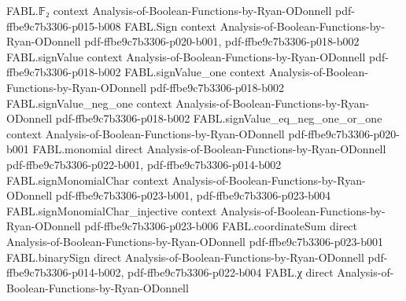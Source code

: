 \begin{theorem}
\label{FABL.exercise5_31b}
\leanok
{}
\proofstep
  {FABL.𝔽₂}
  {context}
  {Analysis-of-Boolean-Functions-by-Ryan-ODonnell}
  {pdf-ffbe9c7b3306-p015-b008}
\proofstep
  {FABL.Sign}
  {context}
  {Analysis-of-Boolean-Functions-by-Ryan-ODonnell}
  {pdf-ffbe9c7b3306-p020-b001,
    pdf-ffbe9c7b3306-p018-b002}
\proofstep
  {FABL.signValue}
  {context}
  {Analysis-of-Boolean-Functions-by-Ryan-ODonnell}
  {pdf-ffbe9c7b3306-p018-b002}
\proofstep
  {FABL.signValue_one}
  {context}
  {Analysis-of-Boolean-Functions-by-Ryan-ODonnell}
  {pdf-ffbe9c7b3306-p018-b002}
\proofstep
  {FABL.signValue_neg_one}
  {context}
  {Analysis-of-Boolean-Functions-by-Ryan-ODonnell}
  {pdf-ffbe9c7b3306-p018-b002}
\proofstep
  {FABL.signValue_eq_neg_one_or_one}
  {context}
  {Analysis-of-Boolean-Functions-by-Ryan-ODonnell}
  {pdf-ffbe9c7b3306-p020-b001}
\proofstep
  {FABL.monomial}
  {direct}
  {Analysis-of-Boolean-Functions-by-Ryan-ODonnell}
  {pdf-ffbe9c7b3306-p022-b001,
    pdf-ffbe9c7b3306-p014-b002}
\proofstep
  {FABL.signMonomialChar}
  {context}
  {Analysis-of-Boolean-Functions-by-Ryan-ODonnell}
  {pdf-ffbe9c7b3306-p023-b001,
    pdf-ffbe9c7b3306-p023-b004}
\proofstep
  {FABL.signMonomialChar_injective}
  {context}
  {Analysis-of-Boolean-Functions-by-Ryan-ODonnell}
  {pdf-ffbe9c7b3306-p023-b006}
\proofstep
  {FABL.coordinateSum}
  {direct}
  {Analysis-of-Boolean-Functions-by-Ryan-ODonnell}
  {pdf-ffbe9c7b3306-p023-b001}
\proofstep
  {FABL.binarySign}
  {direct}
  {Analysis-of-Boolean-Functions-by-Ryan-ODonnell}
  {pdf-ffbe9c7b3306-p014-b002,
    pdf-ffbe9c7b3306-p022-b004}
\proofstep
  {FABL.χ}
  {direct}
  {Analysis-of-Boolean-Functions-by-Ryan-ODonnell}

\end{theorem}
